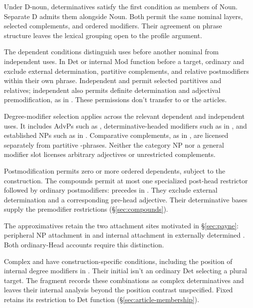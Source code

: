 Under D-noun, determinatives satisfy the first condition as members of Noun. Separate D admits them alongside Noun. Both permit the same nominal layers, selected complements, and ordered modifiers. Their agreement on phrase structure leaves the lexical grouping open to the profile argument.

The dependent conditions distinguish uses before another nominal from independent uses. In Det or internal Mod function before a target, ordinary  and  exclude external determination, partitive complements, and relative postmodifiers within their own phrase. Independent  and  permit selected partitives and relatives; independent  also permits definite determination and adjectival premodification, as in . These permissions don't transfer to  or the articles.

Degree-modifier selection applies across the relevant dependent and independent uses. It includes AdvPs such as , determinative-headed modifiers such as  in , and established NPs such as  in . Comparative complements, as in , are licensed separately from partitive -phrases. Neither the category NP nor a general modifier slot licenses arbitrary adjectives or unrestricted complements.

Postmodification permits zero or more ordered dependents, subject to the construction. The compounds permit at most one specialized post-head restrictor followed by ordinary postmodifiers:  precedes  in . They exclude external determination and a corresponding pre-head adjective. Their determinative bases supply the premodifier restrictions (§\ref{sec:compounds}).

The approximatives retain the two attachment sites motivated in §\ref{sec:payne}: peripheral NP attachment in  and internal attachment in externally determined . Both ordinary-Head accounts require this distinction.

Complex  and  have construction-specific conditions, including the position of internal degree modifiers in . Their initial  isn't an ordinary Det selecting a plural  target. The fragment records these combinations as complex determinatives and leaves their internal analysis beyond the position contrast unspecified. Fixed  retains its restriction to Det function (§\ref{sec:article-membership}).

